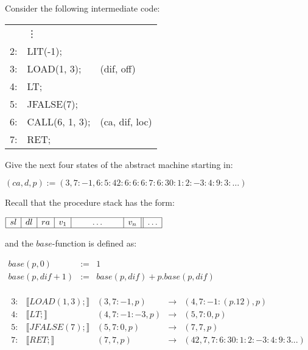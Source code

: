 \begin{exercise}{30}
  Consider the following intermediate code:
  \begin{center}
  \begin{tabular}{rll}
       & \vdots \\
    2: & LIT(-1);\\
    3: & LOAD(1, 3); & (dif, off) \\
    4: & LT; \\
    5: & JFALSE(7); \\
    6:& CALL(6, 1, 3); & (ca, dif, loc) \\
    7:& RET; \\
  \end{tabular}
  \end{center}

  Give the next four states of the abstract machine starting in:
  \begin{center}
    $(ca, d, p) := (3, 7:-1, 6:5:42:6:6:6:7:6:30:1:2:-3:4:9:3:\ldots)$
  \end{center}

  Recall that the procedure stack has the form:
  \begin{center}
    $\begin{array}{|c|c|c|c|c|c||c|}
      \hline
      sl&dl&ra&v_1&\qquad\ldots\qquad&v_n&\ldots
      \\\hline
    \end{array}$
  \end{center}
  and the $\textit{base}$-function is defined as:
  \begin{center}
    $\begin{array}{rcl}
      \textit{base}(p, 0) &:=& 1 \\
      \textit{base}(p, \textit{dif}+1) &:=& \textit{base}(p, \textit{dif}) + p.\textit{base}(p, \textit{dif})\\
    \end{array}$
  \end{center}
\end{exercise}

\begin{solution}
  \[
    \begin{array}{lclcl}
      3:& \llbracket LOAD(1,3);	\rrbracket & (3,7:-1,p) & \to & (4,7:-1:(p.12),p)\\
      4:& \llbracket LT; 	\rrbracket & (4,7:-1:-3,p) & \to & (5,7:0,p)\\
      5:& \llbracket JFALSE(7);	 \rrbracket & (5,7:0,p) & \to & (7,7,p)\\
      7:& \llbracket RET; \rrbracket & (7,7,p) &\to & (42,7,7:6:30:1:2:-3:4:9:3...) \\
    \end{array}
  \]
\end{solution}


